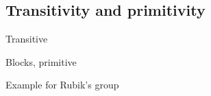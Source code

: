 


\subsection{Transitivity and primitivity}

\begin{slide}
    Transitive
\end{slide}

\begin{slide}
    Blocks, primitive
\end{slide}

\begin{slide}
    Example for Rubik's group
\end{slide}